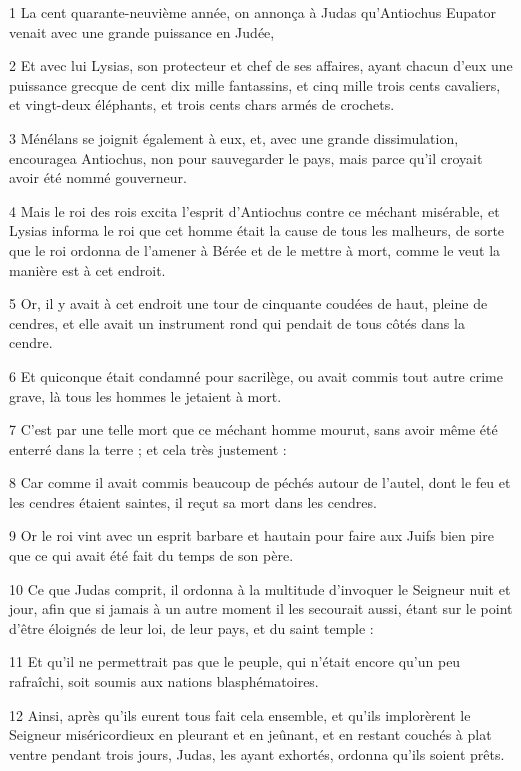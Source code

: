 \par 1 La cent quarante-neuvième année, on annonça à Judas qu'Antiochus Eupator venait avec une grande puissance en Judée,
\par 2 Et avec lui Lysias, son protecteur et chef de ses affaires, ayant chacun d'eux une puissance grecque de cent dix mille fantassins, et cinq mille trois cents cavaliers, et vingt-deux éléphants, et trois cents chars armés de crochets.
\par 3 Ménélans se joignit également à eux, et, avec une grande dissimulation, encouragea Antiochus, non pour sauvegarder le pays, mais parce qu'il croyait avoir été nommé gouverneur.
\par 4 Mais le roi des rois excita l'esprit d'Antiochus contre ce méchant misérable, et Lysias informa le roi que cet homme était la cause de tous les malheurs, de sorte que le roi ordonna de l'amener à Bérée et de le mettre à mort, comme le veut la manière est à cet endroit.
\par 5 Or, il y avait à cet endroit une tour de cinquante coudées de haut, pleine de cendres, et elle avait un instrument rond qui pendait de tous côtés dans la cendre.
\par 6 Et quiconque était condamné pour sacrilège, ou avait commis tout autre crime grave, là tous les hommes le jetaient à mort.
\par 7 C'est par une telle mort que ce méchant homme mourut, sans avoir même été enterré dans la terre ; et cela très justement :
\par 8 Car comme il avait commis beaucoup de péchés autour de l'autel, dont le feu et les cendres étaient saintes, il reçut sa mort dans les cendres.
\par 9 Or le roi vint avec un esprit barbare et hautain pour faire aux Juifs bien pire que ce qui avait été fait du temps de son père.
\par 10 Ce que Judas comprit, il ordonna à la multitude d'invoquer le Seigneur nuit et jour, afin que si jamais à un autre moment il les secourait aussi, étant sur le point d'être éloignés de leur loi, de leur pays, et du saint temple :
\par 11 Et qu'il ne permettrait pas que le peuple, qui n'était encore qu'un peu rafraîchi, soit soumis aux nations blasphématoires.
\par 12 Ainsi, après qu'ils eurent tous fait cela ensemble, et qu'ils implorèrent le Seigneur miséricordieux en pleurant et en jeûnant, et en restant couchés à plat ventre pendant trois jours, Judas, les ayant exhortés, ordonna qu'ils soient prêts.
